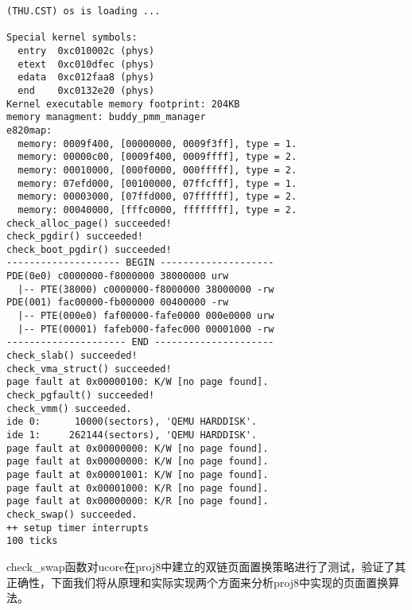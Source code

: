 \begin{lstlisting}
(THU.CST) os is loading ...

Special kernel symbols:
  entry  0xc010002c (phys)
  etext  0xc010dfec (phys)
  edata  0xc012faa8 (phys)
  end    0xc0132e20 (phys)
Kernel executable memory footprint: 204KB
memory managment: buddy_pmm_manager
e820map:
  memory: 0009f400, [00000000, 0009f3ff], type = 1.
  memory: 00000c00, [0009f400, 0009ffff], type = 2.
  memory: 00010000, [000f0000, 000fffff], type = 2.
  memory: 07efd000, [00100000, 07ffcfff], type = 1.
  memory: 00003000, [07ffd000, 07ffffff], type = 2.
  memory: 00040000, [fffc0000, ffffffff], type = 2.
check_alloc_page() succeeded!
check_pgdir() succeeded!
check_boot_pgdir() succeeded!
-------------------- BEGIN --------------------
PDE(0e0) c0000000-f8000000 38000000 urw
  |-- PTE(38000) c0000000-f8000000 38000000 -rw
PDE(001) fac00000-fb000000 00400000 -rw
  |-- PTE(000e0) faf00000-fafe0000 000e0000 urw
  |-- PTE(00001) fafeb000-fafec000 00001000 -rw
--------------------- END ---------------------
check_slab() succeeded!
check_vma_struct() succeeded!
page fault at 0x00000100: K/W [no page found].
check_pgfault() succeeded!
check_vmm() succeeded.
ide 0:      10000(sectors), 'QEMU HARDDISK'.
ide 1:     262144(sectors), 'QEMU HARDDISK'.
page fault at 0x00000000: K/W [no page found].
page fault at 0x00000000: K/W [no page found].
page fault at 0x00001001: K/W [no page found].
page fault at 0x00001000: K/R [no page found].
page fault at 0x00000000: K/R [no page found].
check_swap() succeeded.
++ setup timer interrupts
100 ticks
\end{lstlisting}

check\_swap函数对ucore在proj8中建立的双链页面置换策略进行了测试，验证了其正确性，下面我们将从原理和实际实现两个方面来分析proj8中实现的页面置换算法。
